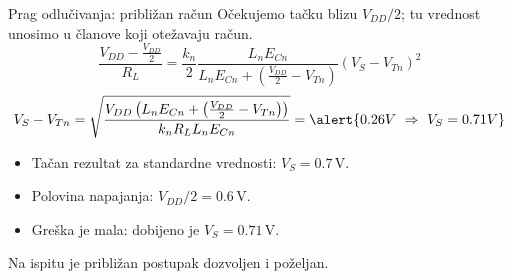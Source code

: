 \begin{frame}[label=09_1-s025]{Prag odlučivanja: približan račun}\setlength{\parskip}{2pt}\setlength{\abovedisplayskip}{4pt}\setlength{\belowdisplayskip}{4pt}\setlength{\abovedisplayshortskip}{3pt}\setlength{\belowdisplayshortskip}{3pt}
Očekujemo tačku blizu $V_{DD}/2$; tu vrednost unosimo u članove koji otežavaju račun.\[\frac{V_{DD}-\frac{V_{DD}}2}{R_L}=\frac{k_n}{2}\frac{L_nE_{Cn}}{L_nE_{Cn}+\left(\frac{V_{DD}}2-V_{Tn}\right)}(V_S-V_{Tn})^2\]
\[V_S-V_{Tn}=\sqrt{\frac{V_{DD}\left(L_nE_{Cn}+\left(\frac{V_{DD}}2-V_{Tn}\right)\right)}{k_nR_LL_nE_{Cn}}}=\alert{0.26V\ \Rightarrow\ V_S=0.71V}\]
\begin{itemize}
\item Tačan rezultat za standardne vrednosti: \alert{$V_S=0.7\,\mathrm V$}.
\item Polovina napajanja: $V_{DD}/2=0.6\,\mathrm V$.
\item Greška je mala: dobijeno je $V_S=0.71\,\mathrm V$.
\end{itemize}
\alert{Na ispitu je približan postupak dozvoljen i poželjan.}
\end{frame}
